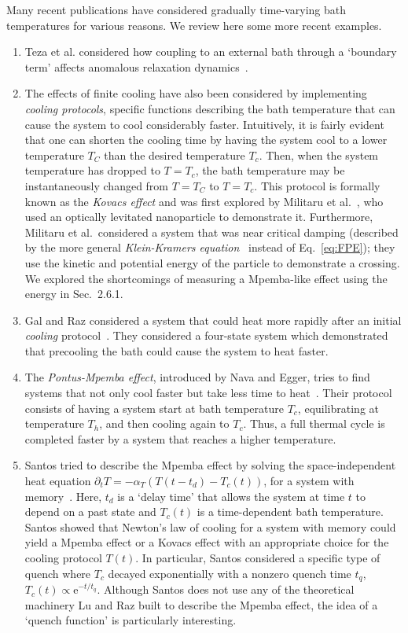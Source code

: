 \documentclass[hyperref={colorlinks=true, urlcolor=blue, citecolor=blue, final, bound}]{sfuthesis}
\newcommand{\e}{\mathrm{e}}
\begin{document}
Many recent publications have considered gradually time-varying bath temperatures for various reasons. We review here some more recent examples.
\begin{enumerate}
    \item Teza et al. considered how coupling to an external bath through a `boundary term' affects anomalous relaxation dynamics~\cite{Teza2023}. 
    \item The effects of finite cooling have also been considered by implementing \textit{cooling protocols}, specific functions describing the bath temperature that can cause the system to cool considerably faster. Intuitively, it is fairly evident that one can shorten the cooling time by having the system cool to a lower temperature $T_C$ than the desired temperature $T_c$. Then, when the system temperature has dropped to $T=T_c$, the bath temperature may be instantaneously changed from $T=T_C$ to $T=T_c$. This protocol is formally known as the \textit{Kovacs effect} and was first explored by Militaru et al.~\cite{Militaru2021}, who used an optically levitated nanoparticle to demonstrate it. Furthermore, Militaru et al.\ considered a system that was near critical damping (described by the more general \textit{Klein-Kramers equation}~
    \cite{Risken1996} instead of Eq.~\ref{eq:FPE}); they use the kinetic and potential energy of the particle to demonstrate a crossing. We explored the shortcomings of measuring a Mpemba-like effect using the energy in Sec.~2.6.1.
    \item Gal and Raz considered a system that could heat more rapidly after an initial \textit{cooling} protocol~\cite{Gal2020}. They considered a four-state system which demonstrated that precooling the bath could cause the system to heat faster.
    \item The \textit{Pontus-Mpemba effect}, introduced by Nava and Egger, tries to find systems that not only cool faster but take less time to heat~\cite{Nava2025}. Their protocol consists of having a system start at bath temperature $T_c$, equilibrating at temperature $T_h$, and then cooling again to $T_c$. Thus, a full thermal cycle is completed faster by a system that reaches a higher temperature.
    \item Santos tried to describe the Mpemba effect by solving the space-independent heat equation $\partial_t T = -\alpha_T (T(t-t_d)-T_c(t))$, for a system with memory~\cite{Santos2025}. Here, $t_d$ is a `delay time' that allows the system at time $t$ to depend on a past state and $T_c(t)$ is a time-dependent bath temperature. Santos showed that Newton's law of cooling for a system with memory could yield a Mpemba effect or a Kovacs effect with an appropriate choice for the cooling protocol $T(t)$. In particular, Santos considered a specific type of quench where $T_c$ decayed exponentially with a nonzero quench time $t_q$, $T_c(t)\propto \e^{-t/t_q}$.  Although Santos does not use any of the theoretical machinery Lu and Raz built to describe the Mpemba effect, the idea of a `quench function' is particularly interesting.
\end{enumerate}
\end{document}
